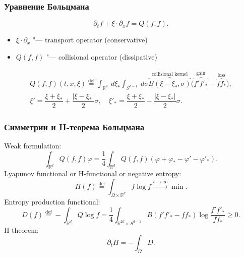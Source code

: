 \documentclass[mathserif]{beamer} %
\newcommand{\eqdef}{\overset{\mathrm{def}}{=}}
\newcommand{\dd}{\:d}%
\newcommand{\pder}[2][]{\partial_{#2}{#1}}
\newcommand{\dxi}{\dd\xi}
\renewcommand{\phi}{\varphi}
\begin{document}
\begin{frame}
    \frametitle{Уравнение Больцмана}
    \begin{equation*}
        \pder[f]{t} + \xi\cdot\pder[f]{x} = Q(f,f).
    \end{equation*}

    \begin{itemize} %
        \item \(\xi\cdot\pder{x}\) "--- transport operator (conservative)
        \item \(Q(f,f)\) "--- collisional operator (dissipative)
    \end{itemize}

    \begin{gather*}
        Q(f,f)(t,x,\xi) \eqdef \int_{\mathbb{R}^d}\dxi_* \int_{S^{d-1}} \dd\sigma
        \overbrace{B(\xi-\xi_*,\sigma)}^\text{collisional kernel}
        \Big( \overbrace{f'f'_*}^\text{gain} - \overbrace{ff_*}^\text{loss} \Big), \\
        \xi' = \dfrac{\xi+\xi_*}2 + \dfrac{|\xi-\xi_*|}2\sigma, \quad
        \xi'_* = \dfrac{\xi+\xi_*}2 - \dfrac{|\xi-\xi_*|}2\sigma.
    \end{gather*}

\end{frame}

\begin{frame}
    \frametitle{Симметрии и H-теорема Больцмана}
    Weak formulation:
    \begin{equation*}
        \int_{\mathbb{R}^d} Q(f,f)\phi = \frac14 \int_{\mathbb{R}^d} Q(f,f) (\phi + \phi_* - \phi' - \phi'_*).
    \end{equation*}
    \pause
    Lyapunov functional or H-functional or negative entropy:
    \begin{equation*}
        H(f) \eqdef \int_{\Omega\times\mathbb{R}^d} f\log{f} \xrightarrow{t\to\infty} \min.
    \end{equation*}
    Entropy production functional:
    \begin{equation*}
        D(f) \eqdef -\int_{\mathbb{R}^d} Q\log{f} = \frac14\int_{\mathbb{R}^{2d}\times S^{d-1}}
        B\left( f'f'_* - ff_* \right) \log\frac{f'f'_*}{ff_*} \geq 0.
    \end{equation*}
    H-theorem:
    \begin{equation*}
        \pder[H]{t} = - \int_\Omega D.
    \end{equation*}
\end{frame}
\end{document}
